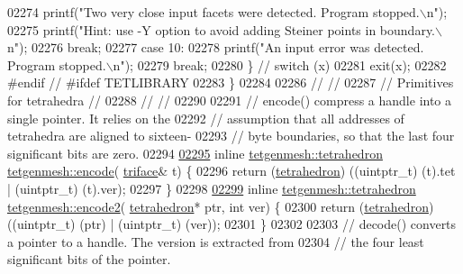 \begin{DoxyCode}
02274     printf(\textcolor{stringliteral}{"Two very close input facets were detected. Program stopped.\(\backslash\)n"});
02275     printf(\textcolor{stringliteral}{"Hint: use -Y option to avoid adding Steiner points in boundary.\(\backslash\)n"});
02276     \textcolor{keywordflow}{break};
02277   \textcolor{keywordflow}{case} 10: 
02278     printf(\textcolor{stringliteral}{"An input error was detected. Program stopped.\(\backslash\)n"}); 
02279     \textcolor{keywordflow}{break};
02280   \} \textcolor{comment}{// switch (x)}
02281   exit(x);
02282 \textcolor{preprocessor}{#endif // #ifdef TETLIBRARY}
02283 \}
02284 
02286 \textcolor{comment}{//                                                                           //}
02287 \textcolor{comment}{// Primitives for tetrahedra                                                 //}
02288 \textcolor{comment}{//                                                                           //}
02290 \textcolor{comment}{}
02291 \textcolor{comment}{// encode()  compress a handle into a single pointer.  It relies on the }
02292 \textcolor{comment}{//   assumption that all addresses of tetrahedra are aligned to sixteen-}
02293 \textcolor{comment}{//   byte boundaries, so that the last four significant bits are zero.}
02294 
\hypertarget{tetgen_8h_source.tex_l02295}{}\hyperlink{classtetgenmesh_a7c32f356cc7f0e57f442f9dac4fccb8a}{02295} \textcolor{keyword}{inline} \hyperlink{classtetgenmesh_a6a12b1c0d1834ca941d16c62e949e5e3}{tetgenmesh::tetrahedron} \hyperlink{classtetgenmesh_a7c32f356cc7f0e57f442f9dac4fccb8a}{tetgenmesh::encode}(
      \hyperlink{classtetgenmesh_1_1triface}{triface}& t) \{
02296   \textcolor{keywordflow}{return} (\hyperlink{classtetgenmesh_a6a12b1c0d1834ca941d16c62e949e5e3}{tetrahedron}) ((uintptr\_t) (t).tet | (uintptr\_t) (t).ver);
02297 \}
02298 
\hypertarget{tetgen_8h_source.tex_l02299}{}\hyperlink{classtetgenmesh_a2bc1e8e424ea557d033135dafcf165bb}{02299} \textcolor{keyword}{inline} \hyperlink{classtetgenmesh_a6a12b1c0d1834ca941d16c62e949e5e3}{tetgenmesh::tetrahedron} \hyperlink{classtetgenmesh_a2bc1e8e424ea557d033135dafcf165bb}{tetgenmesh::encode2}(
      \hyperlink{classtetgenmesh_a6a12b1c0d1834ca941d16c62e949e5e3}{tetrahedron}* ptr, \textcolor{keywordtype}{int} ver) \{
02300   \textcolor{keywordflow}{return} (\hyperlink{classtetgenmesh_a6a12b1c0d1834ca941d16c62e949e5e3}{tetrahedron}) ((uintptr\_t) (ptr) | (uintptr\_t) (ver));
02301 \}
02302 
02303 \textcolor{comment}{// decode()  converts a pointer to a handle. The version is extracted from}
02304 \textcolor{comment}{//   the four least significant bits of the pointer.}

\end{DoxyCode}
